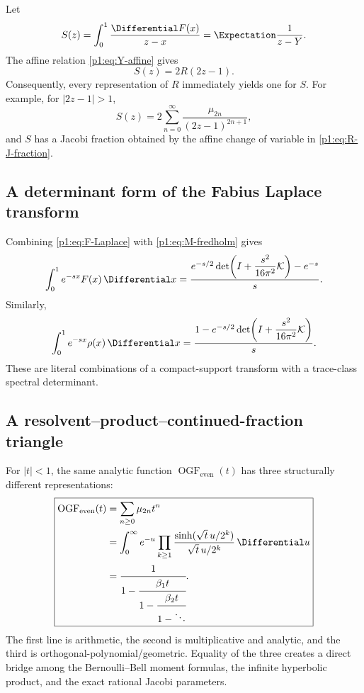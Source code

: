 \documentclass[11pt]{article}
\theoremstyle{definition}
\theoremstyle{remark}
\newcommand{\cK}{\mathcal K}
\newcommand{\EvenMomentOrdinaryGeneratingFunction}{\operatorname{OGF}_{\mathrm{even}}}
\begin{document}
Let
\begin{equation}
 S(z)=\int_0^1\frac{\Differential F(x)}{z-x}=\Expectation\frac1{z-Y}.            \label{p1:eq:S-def}
\end{equation}
The affine relation \eqref{p1:eq:Y-affine} gives
\begin{equation}
 \boxed{S(z)=2R(2z-1).}                                     \label{p1:eq:S-R}
\end{equation}
Consequently, every representation of \(R\) immediately yields one for \(S\).  For example,
for \(|2z-1|>1\),
\begin{equation}
 S(z)=2\sum_{n=0}^{\infty}\frac{\mu_{2n}}{(2z-1)^{2n+1}},   \label{p1:eq:S-moment}
\end{equation}
and \(S\) has a Jacobi fraction obtained by the affine change of variable in
\eqref{p1:eq:R-J-fraction}.

\subsection{A determinant form of the Fabius Laplace transform}

Combining \eqref{p1:eq:F-Laplace} with \eqref{p1:eq:M-fredholm} gives
\begin{equation}
 \int_0^1e^{-sx}F(x)\,\Differential x
 =\frac{e^{-s/2}
 \det\!\left(I+\dfrac{s^2}{16\pi^2}\cK\right)-e^{-s}}{s}.  \label{p1:eq:F-Laplace-determinant}
\end{equation}
Similarly,
\begin{equation}
 \int_0^1e^{-sx}\rho(x)\,\Differential x
 =\frac{1-e^{-s/2}
 \det\!\left(I+\dfrac{s^2}{16\pi^2}\cK\right)}{s}.         \label{p1:eq:rho-half-determinant}
\end{equation}
These are literal combinations of a compact-support transform with a trace-class spectral
determinant.

\subsection{A resolvent--product--continued-fraction triangle}

For \(|t|<1\), the same analytic function
\(\EvenMomentOrdinaryGeneratingFunction(t)\) has three structurally different
representations:
\begin{equation}
 \boxed{
 \begin{aligned}
 \EvenMomentOrdinaryGeneratingFunction(t)
 &=\sum_{n\ge0}\mu_{2n}t^n\\
 &=\int_0^{\infty}e^{-u}
   \prod_{k\ge1}\frac{\sinh(\sqrt t\,u/2^k)}{\sqrt t\,u/2^k}\,\Differential u\\
 &=\cfrac{1}{1-\cfrac{\beta_1t}{1-\cfrac{\beta_2t}{1-\ddots}}}.
 \end{aligned}
 }                                                           \label{p1:eq:triangle}
\end{equation}
The first line is arithmetic, the second is multiplicative and analytic, and the third is
orthogonal-polynomial/geometric.  Equality of the three creates a direct bridge among the
Bernoulli--Bell moment formulas, the infinite hyperbolic product, and the exact rational
Jacobi parameters.
\end{document}
